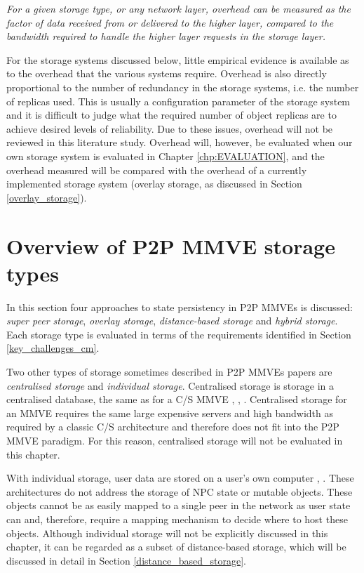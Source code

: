 \emph{For a given storage type, or any network layer, overhead can be measured as the factor of data received from or delivered to the higher layer, compared to the bandwidth required to handle the higher layer requests in the storage layer.}

For the storage systems discussed below, little empirical evidence is available as to the overhead that the various systems require. Overhead is also directly proportional to the number of redundancy in the storage systems, i.e. the number of replicas used. This is usually a configuration parameter of the storage system and it is difficult to judge what the required number of object replicas are to achieve desired levels of reliability. Due to these issues, overhead will not be reviewed in this literature study. Overhead will, however, be evaluated when our own storage system is evaluated in Chapter \ref{chp:EVALUATION}, and the overhead measured will be compared with the overhead of a currently implemented storage system (overlay storage, as discussed in Section \ref{overlay_storage}).

\section{Overview of P2P MMVE storage types}
\label{storage_type_overview}

In this section four approaches to state persistency in P2P MMVEs is discussed: \emph{super peer storage}, \emph{overlay storage}, \emph{distance-based storage} and \emph{hybrid storage}. Each storage type is evaluated in terms of the requirements identified in Section \ref{key_challenges_cm}.

Two other types of storage sometimes described in P2P MMVEs papers are \emph{centralised storage} and \emph{individual storage}. Centralised storage is storage in a centralised database, the same as for a C/S MMVE \cite{badumna_engine}, \cite{rooney_centralised_storage}, \cite{hybrid_p2p_cs_centralised}. Centralised storage for an MMVE requires the same large expensive servers and high bandwidth as required by a classic C/S architecture and therefore does not fit into the P2P MMVE paradigm. For this reason, centralised storage will not be evaluated in this chapter.

With individual storage, user data are stored on a user's own computer  \cite{individual_storage1}, \cite{cheat_proof_playout}. These architectures do not address the storage of NPC state or mutable objects. These objects cannot be as easily mapped to a single peer in the network as user state can and, therefore, require a mapping mechanism to decide where to host these objects. Although individual storage will not be explicitly discussed in this chapter, it can be regarded as a subset of distance-based storage, which will be discussed in detail in Section \ref{distance_based_storage}.


